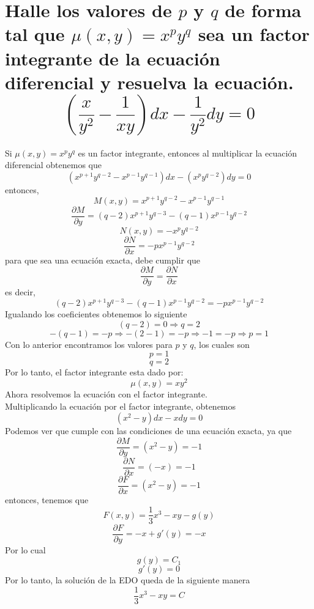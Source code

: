 \section{Halle los valores de $p$ y $q$ de forma tal que $\mu (x,y) = x^p y^q$ sea un factor integrante de la ecuación diferencial y resuelva la ecuación. $$(\frac{x}{y^2}-\frac{1}{xy})dx-\frac{1}{y^2}dy=0$$}

Si $\mu (x,y) = x^p y^q$ es un factor integrante, entonces al multiplicar la ecuación diferencial obtenemos que $$(x^{p+1}y^{q-2}-x^{p-1}y^{q-1})dx-(x^py^{q-2})dy=0$$ entonces,
$$M(x,y)=x^{p+1}y^{q-2}-x^{p-1}y^{q-1}$$
$$\frac{\partial M}{\partial y}=(q-2)x^{p+1}y^{q-3}-(q-1)x^{p-1}y^{q-2}$$
$$N(x,y)=-x^py^{q-2}$$
$$\frac{\partial N}{\partial x}=-px^{p-1}y^{q-2}$$
para que sea una ecuación exacta, debe cumplir que
$$\frac{\partial M}{\partial y}=\frac{\partial N}{\partial x}$$ es decir, 
$$(q-2)x^{p+1}y^{q-3}-(q-1)x^{p-1}y^{q-2}=-px^{p-1}y^{q-2}$$
Igualando los coeficientes obtenemos lo siguiente
$$(q-2)=0 \Rightarrow q=2$$
$$-(q-1)=-p \Rightarrow -(2-1)=-p \Rightarrow -1=-p \Rightarrow p=1$$
Con lo anterior encontramos los valores para $p$ y $q$, los cuales son
$$p=1$$
$$q=2$$
Por lo tanto, el factor integrante esta dado por: $$\mu (x,y) = xy^2$$
Ahora resolvemos la ecuación con el factor integrante.\\
Multiplicando la ecuación por el factor integrante, obtenemos
$$(x^2-y)dx-xdy=0$$
Podemos ver que cumple con las condiciones de una ecuación exacta, ya que
$$\frac{\partial M}{\partial y}=(x^2-y)=-1$$
$$\frac{\partial N}{\partial x}=(-x)=-1$$
$$\frac{\partial F}{\partial x}=(x^2-y)=-1$$
entonces, tenemos que
$$F(x,y)=\frac{1}{3}x^3-xy-g(y)$$
$$\frac{\partial F}{\partial y}=-x+g'(y)=-x$$
Por lo cual 
$$g(y)=C_{1}$$
$$g'(y)=0$$
Por lo tanto, la solución de la EDO queda de la siguiente manera
$$\frac{1}{3} x^3-xy=C$$
